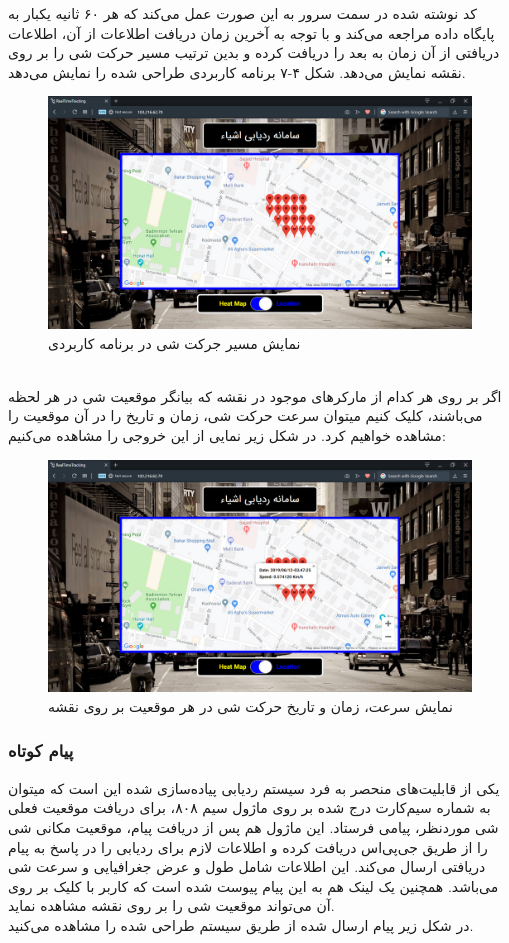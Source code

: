 کد نوشته شده در سمت سرور به این صورت عمل می‌کند که هر ۶۰ ثانیه یکبار به پایگاه داده مراجعه می‌کند و با توجه به آخرین زمان دریافت اطلاعات از آن، اطلاعات دریافتی از  آن زمان به بعد را دریافت کرده و بدین ترتیب مسیر حرکت شی را بر روی نقشه نمایش می‌دهد.
\newpage
شکل ۴-۷ برنامه کاربردی طراحی شده را نمایش می‌دهد.
\\
 \begin{figure}[!h]
 	\centerline{\includegraphics[width=.9\textwidth]{webapp3}}
 	\caption{نمایش مسیر جرکت شی در برنامه کاربردی}
 \end{figure}
\\
 اگر بر روی هر کدام از مارکرهای موجود در نقشه که بیانگر موقعیت شی در هر لحظه می‌باشند، کلیک کنیم میتوان سرعت حرکت شی، زمان و تاریخ را در آن موقعیت را مشاهده خواهیم کرد. در شکل زیر نمایی از این خروجی را مشاهده می‌کنیم:
  \begin{figure}[!h]
 	\centerline{\includegraphics[width=.9\textwidth]{webapp4}}
 	\caption{نمایش سرعت، زمان و تاریخ حرکت شی در هر موقعیت بر روی نقشه}
 \end{figure}
 \subsubsection{پیام کوتاه}
 یکی از قابلیت‌های منحصر به فرد سیستم ردیابی پیاده‌سازی شده این است که میتوان به شماره سیم‌کارت درج شده بر روی ماژول سیم ۸۰۸، برای دریافت موقعیت فعلی شی موردنظر، پیامی فرستاد. این ماژول هم پس از دریافت پیام، موقعیت مکانی شی را از طریق جی‌پی‌اس دریافت کرده و اطلاعات لازم برای ردیابی را در پاسخ به پیام دریافتی ارسال می‌کند. این اطلاعات شامل طول و عرض جغرافیایی و سرعت شی می‌باشد. همچنین یک لینک هم به این پیام پیوست شده است که کاربر با کلیک بر روی آن می‌تواند موقعیت شی را بر روی نقشه مشاهده نماید.\\
 در شکل زیر پیام ارسال شده از طریق سیستم طراحی شده را مشاهده می‌کنید.\\
 

